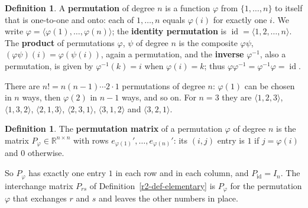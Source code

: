 \documentclass[12pt]{article}
\newcommand{\R}{\mathbb R}
\DeclareMathOperator{\id}{id}
\theoremstyle{definition}
\newtheorem{definition}[theorem]{Definition}
\begin{document}
\begin{definition}\label{r5d-def-permutation}
A \textbf{permutation} of degree \(n\) is a function \(\varphi\) from \(\{1,\dots,n\}\) to itself that is one-to-one
and onto: each of \(1,\dots,n\) equals \(\varphi(i)\) for exactly one \(i\). We write
\(\varphi=\langle\varphi(1),\dots,\varphi(n)\rangle\); the \textbf{identity permutation} is
\(\id=\langle1,2,\dots,n\rangle\). The \textbf{product} of permutations \(\varphi\), \(\psi\) of degree \(n\) is the
composite \(\varphi\psi\), \((\varphi\psi)(i)=\varphi(\psi(i))\), again a permutation, and the \textbf{inverse}
\(\varphi^{-1}\), also a permutation, is given by \(\varphi^{-1}(k)=i\) when \(\varphi(i)=k\); thus
\(\varphi\varphi^{-1}=\varphi^{-1}\varphi=\id\).
\end{definition}
There are \(n!=n(n-1)\cdots2\cdot1\) permutations of degree \(n\): \(\varphi(1)\) can be chosen in \(n\) ways, then
\(\varphi(2)\) in \(n-1\) ways, and so on. For \(n=3\) they are \(\langle1,2,3\rangle\), \(\langle1,3,2\rangle\),
\(\langle2,1,3\rangle\), \(\langle2,3,1\rangle\), \(\langle3,1,2\rangle\) and \(\langle3,2,1\rangle\).

\begin{definition}\label{r5d-def-permutation-matrix}
The \textbf{permutation matrix} of a permutation \(\varphi\) of degree \(n\) is the matrix \(P_\varphi\in\R^{n\times n}\)
with rows \(e_{\varphi(1)}',\dots,e_{\varphi(n)}'\): its \((i,j)\) entry is \(1\) if \(j=\varphi(i)\) and \(0\)
otherwise.
\end{definition}
So \(P_\varphi\) has exactly one entry \(1\) in each row and in each column, and \(P_{\id}=I_n\). The interchange
matrix \(P_{rs}\) of Definition~\ref{r2-def-elementary} is \(P_\varphi\) for the permutation \(\varphi\) that exchanges
\(r\) and \(s\) and leaves the other numbers in place.
\end{document}
